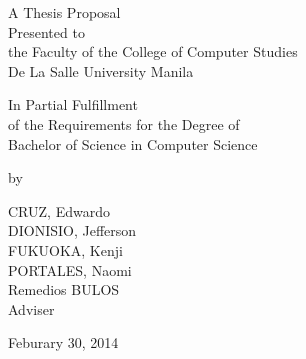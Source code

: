 %
%
%                 

\begin{titlepage}
\centering



\vspace{1.75cm}
A Thesis Proposal\\
Presented to\\
the Faculty of the College of Computer Studies\\
De La Salle University Manila

\vspace{1.75cm}
In Partial Fulfillment\\
of the Requirements for the Degree of\\
Bachelor of  Science in Computer Science

\vspace{1.75cm}
by\\
\vspace{1cm}

CRUZ, Edwardo \\
DIONISIO, Jefferson  \\
FUKUOKA, Kenji  \\
PORTALES, Naomi  \\

\vspace{1.75cm}
Remedios BULOS \\
Adviser

\vspace{1.75cm}
Feburary 30, 2014
\end{titlepage}
